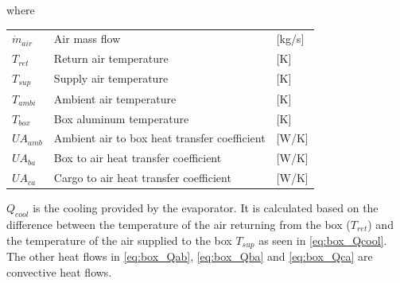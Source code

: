 where
\begin{center}
	\begin{tabular}{l p{8cm} l}
		$\dot{m}_{air}$ & Air mass flow                                & [\si{kg}/{\si{s}}] \\
		$T_{ret}$       & Return air temperature                       & [\si{K}]           \\
		$T_{sup}$       & Supply air temperature                       & [\si{K}]           \\
		$T_{ambi}$      & Ambient air temperature                      & [\si{K}]           \\
		$T_{box}$       & Box aluminum temperature                     & [\si{K}]           \\
		$U A_{amb}$     & Ambient air to box heat transfer coefficient & [\si{W}/\si{K}]    \\
		$U A_{ba}$      & Box to air heat transfer coefficient         & [\si{W}/\si{K}]    \\
		$U A_{ca}$  	& Cargo to air heat transfer coefficient       & [\si{W}/\si{K}]    \\
	\end{tabular}
\end{center}

$Q_{cool}$ is the cooling provided by the evaporator. It is calculated based on the difference between the temperature of the air returning from the box ($T_{ret}$) and the temperature of the air supplied to the box $T_{sup}$ as seen in \cref{eq:box_Qcool}. The other heat flows in \cref{eq:box_Qab}, \cref{eq:box_Qba} and \cref{eq:box_Qca} are convective heat flows.




